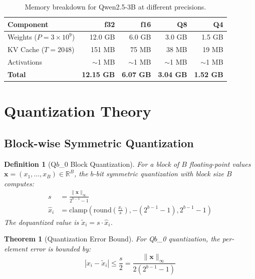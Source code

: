 \documentclass[12pt,a4paper]{article}
\newtheorem{definition}{Definition}[section]
\newtheorem{theorem}{Theorem}[section]
\begin{document}
\begin{table}[H]
\centering
\caption{Memory breakdown for Qwen2.5-3B at different precisions.}
\label{tab:memory}
\begin{tabular}{@{}lrrrr@{}}
\toprule
\textbf{Component} & \textbf{f32} & \textbf{f16} & \textbf{Q8} & \textbf{Q4} \\
\midrule
Weights ($P = 3\times10^9$) & 12.0 GB & 6.0 GB & 3.0 GB & 1.5 GB \\
KV Cache ($T=2048$) & 151 MB & 75 MB & 38 MB & 19 MB \\
Activations & $\sim$1 MB & $\sim$1 MB & $\sim$1 MB & $\sim$1 MB \\
\midrule
\textbf{Total} & \textbf{12.15 GB} & \textbf{6.07 GB} & \textbf{3.04 GB} & \textbf{1.52 GB} \\
\bottomrule
\end{tabular}
\end{table}

\section{Quantization Theory}
\label{sec:quantmath}

\subsection{Block-wise Symmetric Quantization}

\begin{definition}[Q$b$\_0 Block Quantization]
\label{def:quant}
For a block of $B$ floating-point values $\bm{x} = (x_1, \ldots, x_B) \in \mathbb{R}^B$, the $b$-bit symmetric quantization with block size $B$ computes:
\begin{align}
s &= \frac{\|\bm{x}\|_\infty}{2^{b-1} - 1} \label{eq:quant_scale} \\
\hat{x}_i &= \text{clamp}\left(\text{round}\left(\frac{x_i}{s}\right), -(2^{b-1}-1), 2^{b-1}-1\right) \label{eq:quant_round}
\end{align}
The dequantized value is $\tilde{x}_i = s \cdot \hat{x}_i$.
\end{definition}

\begin{theorem}[Quantization Error Bound]
\label{thm:quant_error}
For Q$b$\_0 quantization, the per-element error is bounded by:
\begin{equation}
\boxed{|x_i - \tilde{x}_i| \leq \frac{s}{2} = \frac{\|\bm{x}\|_\infty}{2(2^{b-1} - 1)}}
\label{eq:quant_bound}
\end{equation}
\end{theorem}
\end{document}
